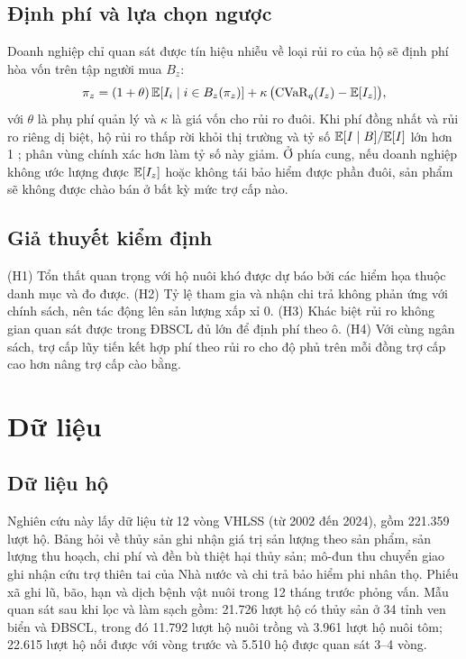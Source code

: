 \documentclass[12pt,a4paper]{article}
\begin{document}
\subsection{Định phí và lựa chọn ngược}

Doanh nghiệp chỉ quan sát được tín hiệu nhiễu về loại rủi ro của hộ sẽ định phí hòa vốn trên tập người mua $B_z$:
\begin{equation}
\pi_z = (1+\theta)\,\mathbb{E}[I_i \mid i \in B_z(\pi_z)] + \kappa\,\big(\mathrm{CVaR}_{q}(I_z) - \mathbb{E}[I_z]\big),
\label{eq:premium}
\end{equation}
với $\theta$ là phụ phí quản lý và $\kappa$ là giá vốn cho rủi ro đuôi. Khi phí đồng nhất và rủi ro riêng dị biệt, hộ rủi ro thấp rời khỏi thị trường và tỷ số $\mathbb{E}[I \mid B]/\mathbb{E}[I]$ lớn hơn 1 \parencite{rothschild1976,just1999}; phân vùng chính xác hơn làm tỷ số này giảm. Ở phía cung, nếu doanh nghiệp không ước lượng được $\mathbb{E}[I_z]$ hoặc không tái bảo hiểm được phần đuôi, sản phẩm sẽ không được chào bán ở bất kỳ mức trợ cấp nào.

\subsection{Giả thuyết kiểm định}

(H1) Tổn thất quan trọng với hộ nuôi khó được dự báo bởi các hiểm họa thuộc danh mục và đo được. (H2) Tỷ lệ tham gia và nhận chi trả không phản ứng với chính sách, nên tác động lên sản lượng xấp xỉ 0. (H3) Khác biệt rủi ro không gian quan sát được trong ĐBSCL đủ lớn để định phí theo ô. (H4) Với cùng ngân sách, trợ cấp lũy tiến kết hợp phí theo rủi ro cho độ phủ trên mỗi đồng trợ cấp cao hơn nâng trợ cấp cào bằng.

\section{Dữ liệu}
\label{sec:data}

\subsection{Dữ liệu hộ}

Nghiên cứu này lấy dữ liệu từ 12 vòng VHLSS (từ 2002 đến 2024), gồm 221.359 lượt hộ. Bảng hỏi về thủy sản ghi nhận giá trị sản lượng theo sản phẩm, sản lượng thu hoạch, chi phí và đền bù thiệt hại thủy sản; mô-đun thu chuyển giao ghi nhận cứu trợ thiên tai của Nhà nước và chi trả bảo hiểm phi nhân thọ. Phiếu xã ghi lũ, bão, hạn và dịch bệnh vật nuôi trong 12 tháng trước phỏng vấn. Mẫu quan sát sau khi lọc và làm sạch gồm: 21.726 lượt hộ có thủy sản ở 34 tỉnh ven biển và ĐBSCL, trong đó 11.792 lượt hộ nuôi trồng và 3.961 lượt hộ nuôi tôm; 22.615 lượt hộ nối được với vòng trước và 5.510 hộ được quan sát 3--4 vòng.
\end{document}
